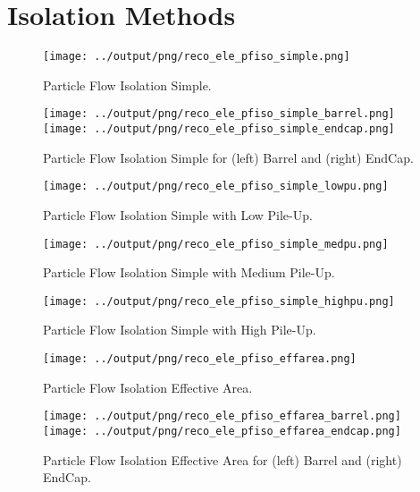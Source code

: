 \documentclass[11pt]{book}
\begin{document}
\section{Isolation Methods}
\begin{figure}[ht]
\centering
\texttt{[image: ../output/png/reco\_ele\_pfiso\_simple.png]}
\caption{Particle Flow Isolation Simple.}
\label{fig:reco_ele_pfiso_simple}
\end{figure}

\begin{figure}[ht]
\centering
\texttt{[image: ../output/png/reco\_ele\_pfiso\_simple\_barrel.png]}
\texttt{[image: ../output/png/reco\_ele\_pfiso\_simple\_endcap.png]}
\caption{Particle Flow Isolation Simple for (left) Barrel and (right) EndCap.}
\label{fig:reco_ele_pfiso_simple_regions}
\end{figure}

\begin{figure}[ht]
\centering
\texttt{[image: ../output/png/reco\_ele\_pfiso\_simple\_lowpu.png]}
\caption{Particle Flow Isolation Simple with Low Pile-Up.}
\label{fig:reco_ele_pfiso_simple_lowpu}
\end{figure}

\begin{figure}[ht]
\centering
\texttt{[image: ../output/png/reco\_ele\_pfiso\_simple\_medpu.png]}
\caption{Particle Flow Isolation Simple with Medium Pile-Up.}
\label{fig:reco_ele_pfiso_simple_medpu}
\end{figure}

\begin{figure}[ht]
\centering
\texttt{[image: ../output/png/reco\_ele\_pfiso\_simple\_highpu.png]}
\caption{Particle Flow Isolation Simple with High Pile-Up.}
\label{fig:reco_ele_pfiso_simple_highpu}
\end{figure}

\begin{figure}[ht]
\centering
\texttt{[image: ../output/png/reco\_ele\_pfiso\_effarea.png]}
\caption{Particle Flow Isolation Effective Area.}
\label{fig:reco_ele_pfiso_effarea}
\end{figure}

\begin{figure}[ht]
\centering
\texttt{[image: ../output/png/reco\_ele\_pfiso\_effarea\_barrel.png]}
\texttt{[image: ../output/png/reco\_ele\_pfiso\_effarea\_endcap.png]}
\caption{Particle Flow Isolation Effective Area for (left) Barrel and (right) EndCap.}
\label{fig:reco_ele_pfiso_effarea_regions}
\end{figure}
\end{document}
